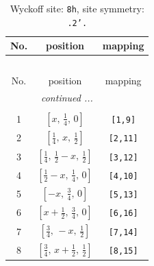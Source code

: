 \documentclass[fleqn,8pt]{jsarticle}
\begin{document}
\begin{longtable}{ccc}
\caption{Wyckoff site: {\tt 8h}, site symmetry: {\tt .2'.}}
 \\
 \hline \hline
No. & position & mapping \\ \hline \endfirsthead

\multicolumn{2}{l}{\tablename\ \thetable{}} \\
 \hline \hline
No. & position & mapping \\ \hline \endhead

 \hline \hline
\multicolumn{2}{r}{\footnotesize\it continued ...} \\ \endfoot

 \hline \hline
\multicolumn{2}{r}{} \\ \endlastfoot

1 & $\left[ x,\, \frac{1}{4},\, 0 \right]$ & {\tt [1,9]} \\ \hline
2 & $\left[ \frac{1}{4},\, x,\, \frac{1}{2} \right]$ & {\tt [2,11]} \\ \hline
3 & $\left[ \frac{1}{4},\, \frac{1}{2} - x,\, \frac{1}{2} \right]$ & {\tt [3,12]} \\ \hline
4 & $\left[ \frac{1}{2} - x,\, \frac{1}{4},\, 0 \right]$ & {\tt [4,10]} \\ \hline
5 & $\left[ - x,\, \frac{3}{4},\, 0 \right]$ & {\tt [5,13]} \\ \hline
6 & $\left[ x + \frac{1}{2},\, \frac{3}{4},\, 0 \right]$ & {\tt [6,16]} \\ \hline
7 & $\left[ \frac{3}{4},\, - x,\, \frac{1}{2} \right]$ & {\tt [7,14]} \\ \hline
8 & $\left[ \frac{3}{4},\, x + \frac{1}{2},\, \frac{1}{2} \right]$ & {\tt [8,15]} \\
\end{longtable}
\renewcommand{\arraystretch}{1.2}
\end{document}
